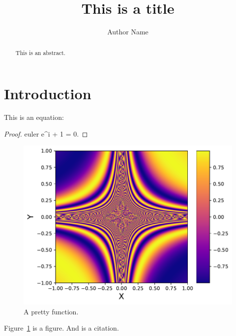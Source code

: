\documentclass[modern]{aastex61}
\begin{document}
\title{This is a title}

\author{Author Name}


\begin{abstract}
This is an abstract.
\end{abstract}

\section{Introduction}
\label{sec:intro}

This is an equation:

\begin{proof}{euler}
    \label{eq:euler}
    e^{i\pi} + 1 = 0.
\end{proof}

\begin{figure}[t!]
    \begin{centering}
    \includegraphics[width=0.5\linewidth]{figures/pretty_function.pdf}
    \caption{\label{fig:pretty_function}
             A pretty function.
             }
    \end{centering}
\end{figure}

Figure~\ref{fig:pretty_function} is a figure. And \citet{Luger2018} is
a citation.


\end{document}
